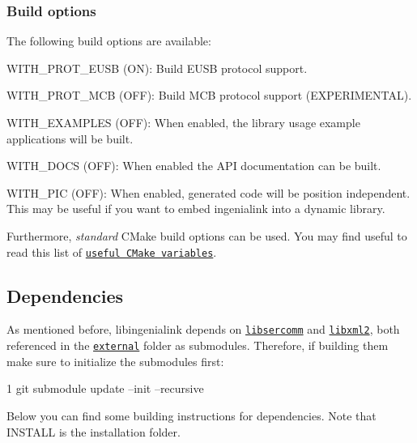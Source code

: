 \subsubsection*{Build options}

The following build options are available\+:


\begin{DoxyItemize}
\item {\ttfamily W\+I\+T\+H\+\_\+\+P\+R\+O\+T\+\_\+\+E\+U\+SB} (ON)\+: Build {\ttfamily E\+U\+SB} protocol support.
\item {\ttfamily W\+I\+T\+H\+\_\+\+P\+R\+O\+T\+\_\+\+M\+CB} (O\+FF)\+: Build {\ttfamily M\+CB} protocol support (E\+X\+P\+E\+R\+I\+M\+E\+N\+T\+AL).
\item {\ttfamily W\+I\+T\+H\+\_\+\+E\+X\+A\+M\+P\+L\+ES} (O\+FF)\+: When enabled, the library usage example applications will be built.
\item {\ttfamily W\+I\+T\+H\+\_\+\+D\+O\+CS} (O\+FF)\+: When enabled the A\+PI documentation can be built.
\item {\ttfamily W\+I\+T\+H\+\_\+\+P\+IC} (O\+FF)\+: When enabled, generated code will be position independent. This may be useful if you want to embed ingenialink into a dynamic library.
\end{DoxyItemize}

Furthermore, {\itshape standard} C\+Make build options can be used. You may find useful to read this list of \href{https://cmake.org/Wiki/CMake_Useful_Variables}{\tt useful C\+Make variables}.

\subsection*{Dependencies}

As mentioned before, {\ttfamily libingenialink} depends on \href{https://github.com/ingeniamc/sercomm}{\tt libsercomm} and \href{https://xmlsoft.org}{\tt libxml2}, both referenced in the \href{https://github.com/ingeniamc/ingenialink/tree/master/external}{\tt external} folder as submodules. Therefore, if building them make sure to initialize the submodules first\+:


\begin{DoxyCode}
1 git submodule update --init --recursive
\end{DoxyCode}


Below you can find some building instructions for dependencies. Note that {\ttfamily I\+N\+S\+T\+A\+LL} is the installation folder.

